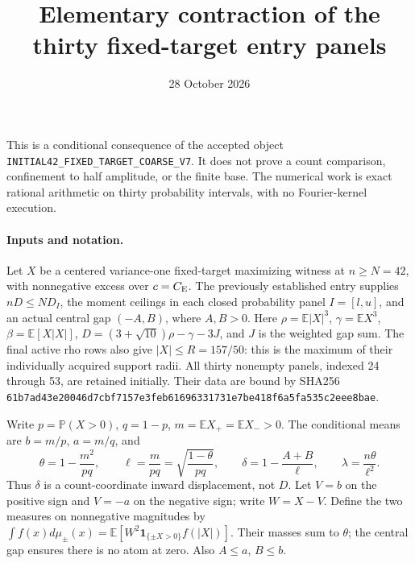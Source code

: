 \documentclass[10pt]{article}
\title{Elementary contraction of the thirty fixed-target entry panels}
\author{}\date{28 October 2026}
\newcommand{\E}{\mathbb E}\newcommand{\Pp}{\mathbb P}
\newcommand{\CE}{C_{\rm E}}\newcommand{\R}{\mathbb R}
\begin{document}
\maketitle
\noindent This is a conditional consequence of the accepted object
\texttt{INITIAL42\_FIXED\_TARGET\_COARSE\_V7}. It does not prove a count
comparison, confinement to half amplitude, or the finite base. The numerical
work is exact rational arithmetic on thirty probability intervals, with no
Fourier-kernel execution.

\paragraph{Inputs and notation.}
Let \(X\) be a centered variance-one fixed-target maximizing witness at
\(n\ge N=42\), with nonnegative excess over \(c=\CE\).
The previously established entry supplies \(nD\le ND_I\), the moment
ceilings in each closed probability panel \(I=[l,u]\), and an actual central
gap \((-A,B)\), where \(A,B>0\).
Here \(\rho=\E|X|^3\), \(\gamma=\E X^3\), \(\beta=\E[X|X|]\),
\(D=(3+\sqrt{10})\rho-\gamma-3J\), and \(J\) is the weighted gap sum.
The final active rho rows also give \(|X|\le R=157/50\):
this is the maximum of their individually acquired support radii.
All thirty nonempty panels, indexed 24 through 53, are retained initially.
Their data are bound by SHA256
\texttt{61b7ad43e20046d7cbf7157e3feb61696331731e7be418f6a5fa535c2eee8bae}.

Write \(p=\Pp(X>0)\), \(q=1-p\), \(m=\E X_+=\E X_->0\).
The conditional means are \(b=m/p\), \(a=m/q\), and
\[
 \theta=1-\frac{m^2}{pq},\qquad
 \ell=\frac m{pq}=\sqrt{\frac{1-\theta}{pq}},\qquad
 \delta=1-\frac{A+B}{\ell},\qquad
 \lambda=\frac{n\theta}{\ell^2}.
\]
Thus \(\delta\) is a count-coordinate inward displacement, not \(D\).
Let \(V=b\) on the positive sign and \(V=-a\) on the negative sign;
write \(W=X-V\). Define the two measures on nonnegative magnitudes by
\(\int f(x)d\mu_\pm(x)=\E[W^2\mathbf1_{\{\pm X>0\}}f(|X|)]\).
Their masses sum to \(\theta\); the central gap ensures there is no atom at zero.
Also \(A\le a\), \(B\le b\).
\end{document}
